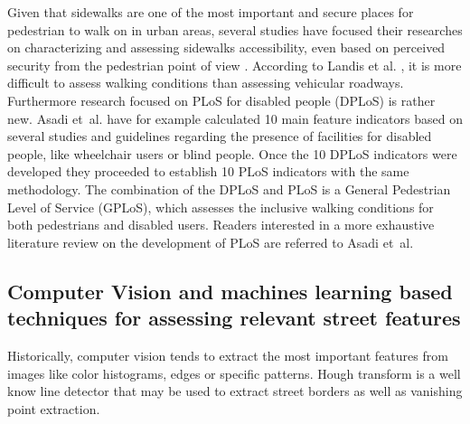 \documentclass[10pt,conference,a4paper]{IEEEtran}
\begin{document}
Given that sidewalks are one of the most important and secure places for pedestrian to walk on in urban areas, several studies have focused their researches on characterizing and assessing sidewalks accessibility, even based on perceived security from the pedestrian point of view \cite{tan_research_2007}. According to Landis et al. \cite{landis_modeling_2001}, it is more difficult to assess walking conditions than assessing vehicular roadways.  Furthermore research focused on PLoS for disabled people (DPLoS) is rather new. Asadi et~al. \cite{asadi-shekari_zohreh_disabled_2013} have for example calculated 10 main feature indicators based on several studies and guidelines regarding the presence of facilities for disabled people, like wheelchair users or blind people. Once the 10 DPLoS indicators were developed they proceeded to establish 10 PLoS indicators with the same methodology.  The combination of the DPLoS and PLoS is a General Pedestrian Level of Service (GPLoS), which assesses the inclusive walking conditions for both pedestrians and disabled users. Readers interested in a more exhaustive literature review on the development of PLoS are referred to Asadi et~al.
 
\subsection{Computer Vision and machines learning based techniques for assessing relevant street features}
Historically, computer vision tends to extract the most important features from images like color histograms, edges \cite{canny_computational_1986} or specific patterns. %
Hough transform is a well know line detector that may be used to extract street borders %
\cite{kiryati_probabilistic_1991} 
as well as vanishing point extraction. %
\end{document}
